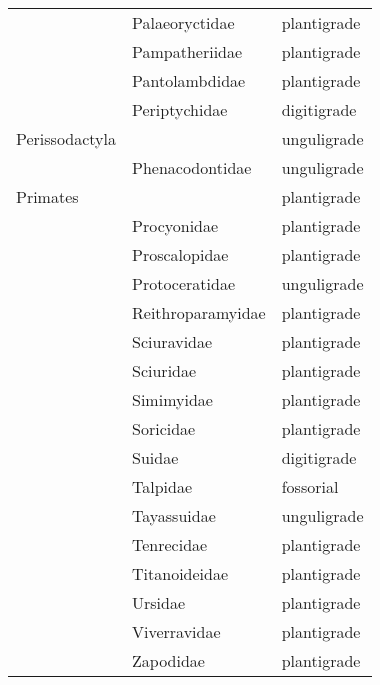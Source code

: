 \begin{center}
\begin{longtable}{ l l l }
    & Palaeoryctidae & plantigrade \\ 
    & Pampatheriidae & plantigrade \\ 
    & Pantolambdidae & plantigrade \\ 
    & Periptychidae & digitigrade \\ 
    Perissodactyla &  & unguligrade \\ 
    & Phenacodontidae & unguligrade \\ 
    Primates &  & plantigrade \\ 
    & Procyonidae & plantigrade \\ 
    & Proscalopidae & plantigrade \\ 
    & Protoceratidae & unguligrade \\ 
    & Reithroparamyidae & plantigrade \\ 
    & Sciuravidae & plantigrade \\ 
    & Sciuridae & plantigrade \\ 
    & Simimyidae & plantigrade \\ 
    & Soricidae & plantigrade \\ 
    & Suidae & digitigrade \\ 
    & Talpidae & fossorial \\ 
    & Tayassuidae & unguligrade \\ 
    & Tenrecidae & plantigrade \\ 
    & Titanoideidae & plantigrade \\ 
    & Ursidae & plantigrade \\ 
    & Viverravidae & plantigrade \\ 
    & Zapodidae & plantigrade \\ 
    \hline
  \end{longtable}
\end{center}
